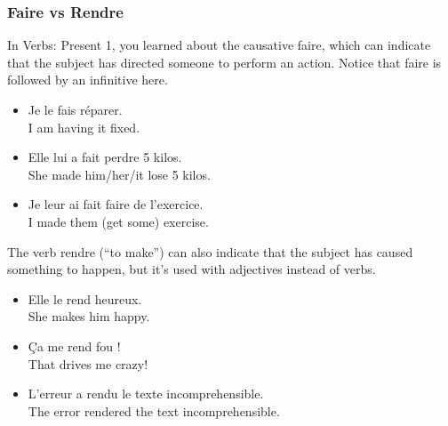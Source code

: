 \subsubsection{Faire vs Rendre}

In Verbs: Present 1, you learned about the causative faire, which can indicate that the subject has directed someone to perform an action. Notice that faire is followed by an infinitive here.

\begin{itemize}
  \item  Je le fais r{\'e}parer. \\ I am having it fixed.
	\item  Elle lui a fait perdre 5 kilos. \\ She made him/her/it lose 5 kilos.
	\item  Je leur ai fait faire de l'exercice. \\ I made them (get some) exercise.
\end{itemize}

The verb rendre (``to make'') can also indicate that the subject has caused something to happen, but it's used with adjectives instead of verbs.

\begin{itemize}
  \item  Elle le rend heureux. \\ She makes him happy.
	\item  {\c C}a me rend fou ! \\ That drives me crazy!
	\item  L'erreur a rendu le texte incomprehensible. \\ The error rendered the text incomprehensible.
\end{itemize}

$$~$$

